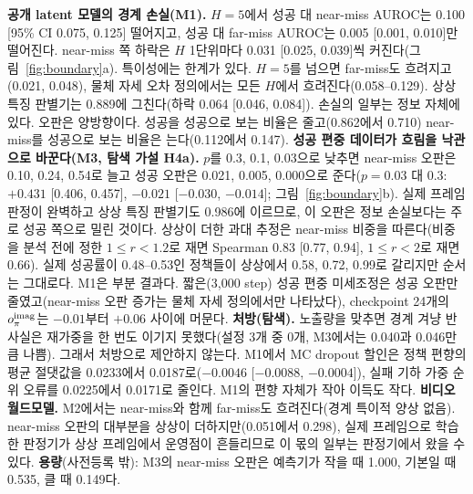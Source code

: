 \documentclass[nouppercase]{kaia}
\begin{document}
\begin{mdframed}
\textbf{공개 latent 모델의 경계 손실(M1).} $H=5$에서 성공 대 near-miss AUROC는 0.100 [95\% CI 0.075, 0.125] 떨어지고, 성공 대 far-miss AUROC는 0.005 [0.001, 0.010]만 떨어진다. near-miss 쪽 하락은 $H$ 1단위마다 0.031 [0.025, 0.039]씩 커진다(그림~\ref{fig:boundary}a). 특이성에는 한계가 있다. $H=5$를 넘으면 far-miss도 흐려지고(0.021, 0.048), 물체 자세 오차 정의에서는 모든 $H$에서 흐려진다(0.058--0.129). 상상 특징 판별기는 0.889에 그친다(하락 0.064 [0.046, 0.084]). 손실의 일부는 정보 자체에 있다. 오판은 양방향이다. 성공을 성공으로 보는 비율은 줄고(0.862에서 0.710) near-miss를 성공으로 보는 비율은 는다(0.112에서 0.147).
\textbf{성공 편중 데이터가 흐림을 낙관으로 바꾼다(M3, 탐색 가설 H4a).} $p$를 0.3, 0.1, 0.03으로 낮추면 near-miss 오판은 0.10, 0.24, 0.54로 늘고 성공 오판은 0.021, 0.005, 0.000으로 준다($p=0.03$ 대 0.3: $+0.431$ [0.406, 0.457], $-0.021$ [$-0.030$, $-0.014$]; 그림~\ref{fig:boundary}b). 실제 프레임 판정이 완벽하고 상상 특징 판별기도 0.986에 이르므로, 이 오판은 정보 손실보다는 주로 성공 쪽으로 밀린 것이다. 상상이 더한 과대 추정은 near-miss 비중을 따른다(비중을 분석 전에 정한 $1\le r<1.2$로 재면 Spearman 0.83 [0.77, 0.94], $1\le r<2$로 재면 0.66). 실제 성공률이 0.48--0.53인 정책들이 상상에서 0.58, 0.72, 0.99로 갈리지만 순서는 그대로다. M1은 부분 결과다. 짧은(3,000 step) 성공 편중 미세조정은 성공 오판만 줄였고(near-miss 오판 증가는 물체 자세 정의에서만 나타났다), checkpoint 24개의 $o^{\rm imag}_\pi$는 $-0.01$부터 $+0.06$ 사이에 머문다.
\textbf{처방(탐색).} 노출량을 맞추면 경계 겨냥 반사실은 재가중을 한 번도 이기지 못했다(설정 3개 중 0개, M3에서는 0.040과 0.046만큼 나쁨). 그래서 처방으로 제안하지 않는다. M1에서 MC dropout 할인은 정책 편향의 평균 절댓값을 0.0233에서 0.0187로($-0.0046$ [$-0.0088$, $-0.0004$]), 실패 기하 가중 순위 오류를 0.0225에서 0.0171로 줄인다. M1의 편향 자체가 작아 이득도 작다.
\textbf{비디오 월드모델.} M2에서는 near-miss와 함께 far-miss도 흐려진다(경계 특이적 양상 없음). near-miss 오판의 대부분을 상상이 더하지만(0.051에서 0.298), 실제 프레임으로 학습한 판정기가 상상 프레임에서 운영점이 흔들리므로 이 몫의 일부는 판정기에서 왔을 수 있다. \textbf{용량}(사전등록 밖): M3의 near-miss 오판은 예측기가 작을 때 1.000, 기본일 때 0.535, 클 때 0.149다.

\par\vspace{1pt}

\end{mdframed}
\end{document}
